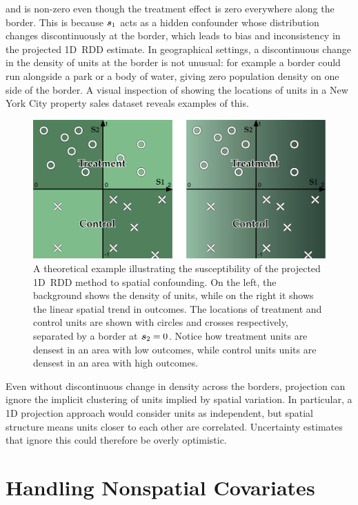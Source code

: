 and is non-zero even though the treatment effect is zero everywhere along the border.
This is because \(\bm{s}_1\) acts as a hidden confounder whose distribution changes discontinuously at the border, which leads to bias and inconsistency in the projected 1D~RDD estimate.
In geographical settings, a discontinuous change in the density of units at the border is not unusual: for example a border could run alongside a park or a body of water, giving zero population density on one side of the border.
A visual inspection of  showing the locations of units in a New York City property sales dataset reveals examples of this.

\begin{figure}[tb]
    \centering
    \includegraphics[height=0.3\textheight]{figures/confounding/confounding.pdf}
    \caption{
        A theoretical example illustrating the susceptibility of the projected 1D~RDD method to spatial confounding.
        On the left, the background shows the density of units, while on the right it shows the linear spatial trend in outcomes.
        The locations of treatment and control units are shown with circles and crosses respectively, separated by a border at \(\bm{s}_2 = 0\).
        Notice how treatment units are densest in an area with low outcomes, while control units units are densest in an area with high outcomes.
        \label{fig:confounding}}
\end{figure}

Even without discontinuous change in density across the borders, projection can ignore the implicit clustering of units implied by spatial variation.
In particular, a 1D projection approach would consider units as independent, but spatial structure means units closer to each other are correlated.
Uncertainty estimates that ignore this could therefore be overly optimistic.


\section{Handling Nonspatial Covariates}
\label{sec:covariates}

